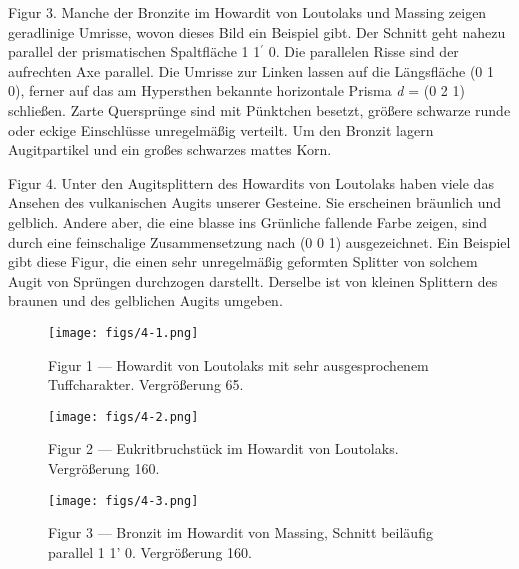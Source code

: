\documentclass[a4paper, 12pt, oneside]{article}
\begin{document}
Figur 3. Manche der Bronzite im Howardit von Loutolaks und Massing zeigen geradlinige Umrisse, wovon dieses Bild ein Beispiel gibt. Der Schnitt geht nahezu parallel der prismatischen Spaltfläche 1 1$^{\prime}$ 0. Die parallelen Risse sind der aufrechten Axe parallel. Die Umrisse zur Linken lassen auf die Längsfläche (0 1 0), ferner auf das am Hypersthen bekannte horizontale Prisma \emph{d} = (0 2 1) schließen. Zarte Quersprünge sind mit Pünktchen besetzt, größere schwarze runde oder eckige Einschlüsse unregelmäßig verteilt. Um den Bronzit lagern Augitpartikel und ein großes schwarzes mattes Korn.

Figur 4. Unter den Augitsplittern des Howardits von Loutolaks haben viele das Ansehen des vulkanischen Augits unserer Gesteine. Sie erscheinen bräunlich und gelblich. Andere aber, die eine blasse ins Grünliche fallende Farbe zeigen, sind durch eine feinschalige Zusammensetzung nach (0 0 1) ausgezeichnet. Ein Beispiel gibt diese Figur, die einen sehr unregelmäßig geformten Splitter von solchem Augit von Sprüngen durchzogen darstellt. Derselbe ist von kleinen Splittern des braunen und des gelblichen Augits umgeben.
\clearpage

\vspace*{\fill}
\begin{figure}[H]
\centering
\texttt{[image: figs/4-1.png]}
\caption{\small Figur 1 --- Howardit von Loutolaks mit sehr ausgesprochenem Tuffcharakter. Vergrößerung 65.}
\end{figure}
\vspace*{\fill}
\clearpage

\vspace*{\fill}
\begin{figure}[H]
\centering
\texttt{[image: figs/4-2.png]}
\caption{\small Figur 2 --- Eukritbruchstück im Howardit von Loutolaks. Vergrößerung 160.}
\end{figure}
\vspace*{\fill}
\clearpage

\vspace*{\fill}
\begin{figure}[H]
\centering
\texttt{[image: figs/4-3.png]}
\caption{\small Figur 3 --- Bronzit im Howardit von Massing, Schnitt beiläufig parallel 1 1' 0. Vergrößerung 160.}
\end{figure}
\vspace*{\fill}
\clearpage
\end{document}
